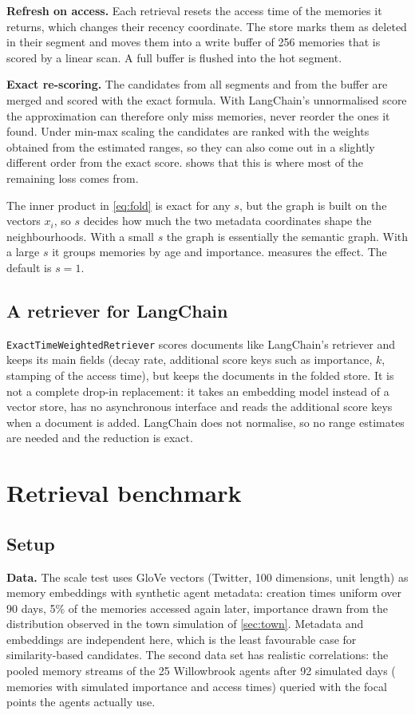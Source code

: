 \documentclass[11pt,a4paper]{article}
\newcommand{\code}[1]{\texttt{#1}}
\begin{document}
\textbf{Refresh on access.} Each retrieval resets the access time of the memories it returns, which changes their recency coordinate. The store marks them as deleted in their segment and moves them into a write buffer of 256 memories that is scored by a linear scan. A full buffer is flushed into the hot segment.

\textbf{Exact re-scoring.} The candidates from all segments and from the buffer are merged and scored with the exact formula. With LangChain's unnormalised score the approximation can therefore only miss memories, never reorder the ones it found. Under min-max scaling the candidates are ranked with the weights obtained from the estimated ranges, so they can also come out in a slightly different order from the exact score.  shows that this is where most of the remaining loss comes from.

The inner product in \cref{eq:fold} is exact for any $s$, but the graph is built on the vectors $x_i$, so $s$ decides how much the two metadata coordinates shape the neighbourhoods. With a small $s$ the graph is essentially the semantic graph. With a large $s$ it groups memories by age and importance.  measures the effect. The default is $s=1$.

\subsection{A retriever for LangChain}

\code{ExactTimeWeightedRetriever} scores documents like LangChain's retriever and keeps its main fields (decay rate, additional score keys such as importance, $k$, stamping of the access time), but keeps the documents in the folded store. It is not a complete drop-in replacement: it takes an embedding model instead of a vector store, has no asynchronous interface and reads the additional score keys when a document is added. LangChain does not normalise, so no range estimates are needed and the reduction is exact.

\section{Retrieval benchmark}
\label{sec:static}

\subsection{Setup}

\textbf{Data.} The scale test uses GloVe vectors (Twitter, 100 dimensions, unit length) as memory embeddings with synthetic agent metadata: creation times uniform over 90 days, 5\% of the memories accessed again later, importance drawn from the distribution observed in the town simulation of \cref{sec:town}. Metadata and embeddings are independent here, which is the least favourable case for similarity-based candidates. The second data set has realistic correlations: the pooled memory streams of the 25 Willowbrook agents after 92 simulated days (\TwN{} memories with simulated importance and access times) queried with the focal points the agents actually use.
\end{document}
